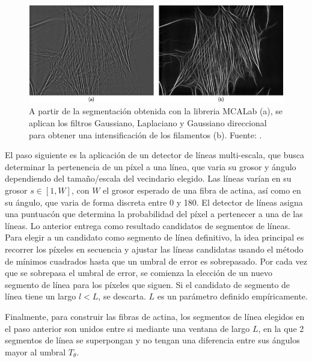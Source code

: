 \begin{figure}[t]
    \centering
    \includegraphics[scale=2]{imagenes/Aliosha2016-GaussLaplFilters.jpg}
    \caption{A partir de la segmentaci\'on obtenida con la libreria MCALab (a), se aplican los filtros Gaussiano, Laplaciano y Gaussiano direccional para obtener una intensificaci\'on de los filamentos (b). Fuente: \cite{alioscha2016robust}.}
    \label{fig:AlioshaRobust}
\end{figure}

El paso siguiente es la aplicaci\'on de un detector de l\'ineas multi-escala, que busca determinar la pertenencia de un p\'ixel a una l\'inea, que varia su grosor y \'angulo dependiendo del tama\~no/escala del vecindario elegido. Las l\'ineas var\'ian en su grosor $s \in [1,W]$, con $W$ el grosor esperado de una fibra de actina, as\'i como en su \'angulo, que varia de forma discreta entre 0 y 180\textdegree. El detector de l\'ineas asigna una puntuac\'on que determina la probabilidad del p\'ixel a pertenecer a una de las l\'ineas. Lo anterior entrega como resultado candidatos de segmentos de l\'ineas. Para elegir a un candidato como segmento de l\'inea definitivo, la idea principal es recorrer los p\'ixeles en secuencia y ajustar las l\'ineas candidatas usando el m\'etodo de m\'inimos cuadrados hasta que un umbral de error es sobrepasado. Por cada vez que se sobrepasa el umbral de error, se comienza la elecci\'on de un nuevo segmento de l\'inea para los p\'ixeles que siguen. Si el candidato de segmento de l\'inea tiene un largo $l < L$, se descarta. $L$ es un par\'ametro definido emp\'iricamente.

Finalmente, para construir las fibras de actina, los segmentos de l\'inea elegidos en el paso anterior son unidos entre si mediante una ventana de largo $L$, en la que 2 segmentos de l\'inea se superpongan y no tengan una diferencia entre sus \'angulos mayor al umbral $T_{\theta}$. 

